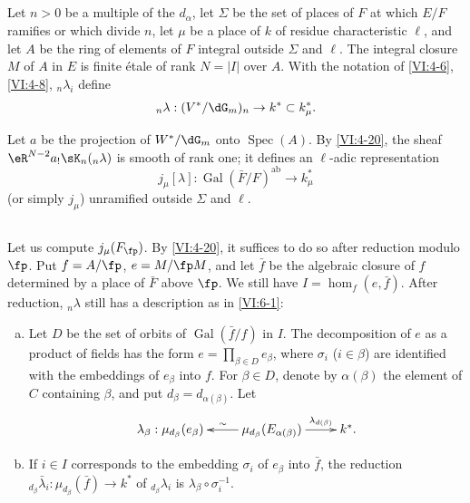 \documentclass[oneside]{book}
\DeclareMathOperator{\gal}{Gal}
\DeclareMathOperator{\spec}{Spec}
\newcounter{char}
\theoremstyle{sga-source}
\theoremstyle{sga-source-dash}
\theoremstyle{sga-source-dotdash}
\theoremstyle{sga-source-number-note-dash}
\theoremstyle{sga-source-note-number-dotdash}
\theoremstyle{sga-source-example-dotdash}
\theoremstyle{sga-source-inline-number}
\theoremstyle{sga-source-bare-number}
\theoremstyle{sga-source}
\newcommand{\PrintPage}[1]{}\newcommand{\MathPage}[1]{}\newcommand{\PrintCite}[2]{#1}\newcommand{\var}[3]{#1}
\begin{document}
\subsection{}\label{VI:6-2}

Let $n>0$ be a multiple of the $d_\alpha$, let $\Sigma$ be the set of places of $F$ 
at which $E/F$ ramifies or which divide $n$, let $\mu$ be a place of $k$ of 
residue characteristic $\ell$, and let $A$ be the ring of elements of $F$ 
integral outside $\Sigma$ and $\ell$. The integral closure $M$ of $A$ in $E$ 
is finite étale of rank $N=|I|$ over $A$. With the notation of \ref{VI:4-6}, 
\ref{VI:4-8}, $_n \lambda_i$ define 
\[
  _n\lambda:(V^\ast/\dG_m)_n \to k^\ast \subset k_\mu^\ast \text{.} 
\]

Let $a$ be the projection of $W^\ast/\dG_m$ onto $\spec(A)$. By 
\ref{VI:4-20}, the sheaf $\eR^{N-2} a_! \sK_n(_n \lambda)$ is smooth of rank 
one; it defines an $\ell$-adic representation 
\[
  j_\mu[\lambda]:\gal(\bar F/F)^\text{ab} \to k_\mu^\ast 
\]
  (or simply $j_\mu$) unramified outside $\Sigma$ and $\ell$. 





\subsection{}\label{VI:6-3}

Let us compute $j_\mu(F_\fp)$. By \ref{VI:4-20}, it suffices to do so 
after reduction modulo $\fp$. Put $f=A/\fp$, $e=M/\fp  M$, and let 
$\bar f$ be the algebraic closure of $f$ determined by a place of $\bar F$ 
above $\fp$. We still have $I=\hom_f(e,\bar f)$. After reduction, 
$_n\lambda$ still has a description as in \ref{VI:6-1}: 
\begin{enumerate}[a)]
  \item Let $D$ be the set of orbits of $\gal(\bar f/f)$ in $I$. The 
    decomposition of $e$ as a product of fields has the form 
    $e=\prod_{\beta\in D} e_\beta$, where $\sigma_i$ ($i\in \beta$) 
    are identified with the \var{embeddings of $e_\beta$ into $f$}{embeddings of $e_\beta$ into $\bar f$}{S45-SOL-0898}. For $\beta\in D$, 
    denote by $\alpha(\beta)$ the element of $C$ \PrintPage{215}
containing $\beta$, and put 
    $d_\beta=d_{\alpha(\beta)}$. Let 
    \[\xymatrix{
      \lambda_\beta : \mu_{d_\beta}(e_\beta) 
        & \ar[l]_-\sim \mu_{d_\beta}(E_{\alpha(\beta)}) \ar[r]^-{\var{\lambda_{d(\beta)}}{\lambda_{\alpha(\beta)}}{S45-SOL-0899}} 
        & k^\ast \text{.} 
    }\]
  \item If $i\in I$ corresponds to the embedding $\sigma_i$ of $e_\beta$ into 
    $\bar f$, the reduction 
    $_{d_\beta} \bar\lambda_i:\mu_{d_\beta}(\bar f) \to k^\ast$ 
    of $_{d_\beta} \lambda_i$ is 
    $\lambda_\beta \circ \sigma_i^{-1}$. 
\end{enumerate}
\end{document}
